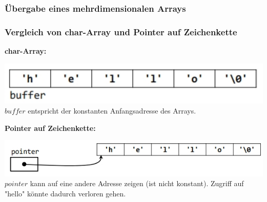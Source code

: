 		\subsubsection{Übergabe eines mehrdimensionalen Arrays}
			
			
		\subsubsection{Vergleich von char-Array und Pointer auf Zeichenkette }
			\begin{minipage}[t]{9 cm}
				\textbf{char-Array:}
				
				\includegraphics[width=1\textwidth]{pics/pointer_char_vergleich_char.jpg}
				$buffer$ entspricht der konstanten Anfangsadresse des Arrays.
			\end{minipage}
			\hspace*{0.5cm}
			\begin{minipage}[t]{9 cm}
				\textbf{Pointer auf Zeichenkette:}
					
					\includegraphics[width=1\textwidth]{pics/pointer_char_vergleich_pointer.jpg}
					$pointer$ kann auf eine andere Adresse zeigen (ist nicht konstant).
					Zugriff auf "hello" könnte dadurch verloren gehen.
			\end{minipage}
			
